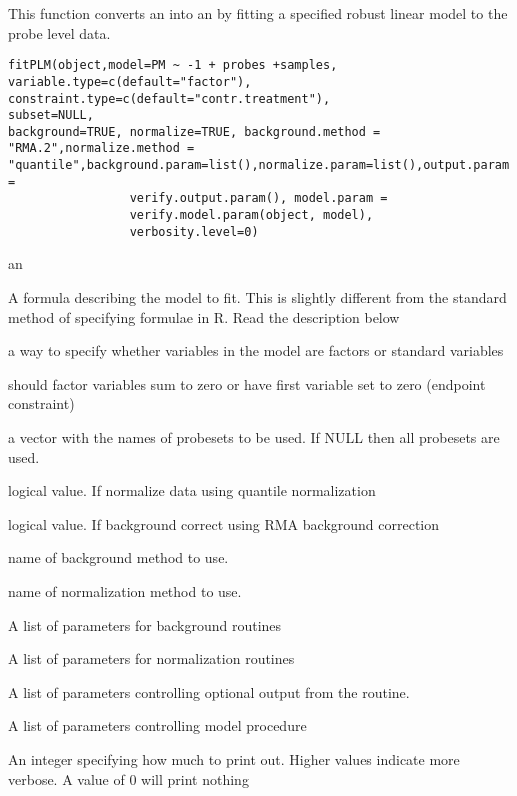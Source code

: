 \begin{Description}\relax
This function converts an  into an
 by fitting a specified robust linear model to the
probe level data.
\end{Description}
\begin{Usage}
\begin{verbatim}
fitPLM(object,model=PM ~ -1 + probes +samples,
variable.type=c(default="factor"),
constraint.type=c(default="contr.treatment"),
subset=NULL,
background=TRUE, normalize=TRUE, background.method = "RMA.2",normalize.method = "quantile",background.param=list(),normalize.param=list(),output.param =
                 verify.output.param(), model.param =
                 verify.model.param(object, model),
                 verbosity.level=0)
\end{verbatim}
\end{Usage}
\begin{Arguments}
\begin{ldescription}
\item[\code{object}] an 
\item[\code{model}] A formula describing the model to fit. This is slightly
different from the standard method of specifying formulae in R. Read
the description below
\item[\code{variable.type}] a way to specify whether variables in the model
are factors or standard variables
\item[\code{constraint.type}] should factor variables sum to zero or have
first variable set to zero (endpoint constraint)
\item[\code{subset}] a vector with the names of probesets to be used. If NULL
then all probesets are used.
\item[\code{normalize}] logical value. If  normalize data using
quantile normalization
\item[\code{background}] logical value. If  background correct
using RMA background correction
\item[\code{background.method}] name of background method to use.
\item[\code{normalize.method}] name of normalization method to use.
\item[\code{background.param}] A list of parameters for background routines
\item[\code{normalize.param}] A list of parameters for normalization
routines
\item[\code{output.param}] A list of parameters controlling optional output
from the routine.
\item[\code{model.param}] A list of parameters controlling model procedure
\item[\code{verbosity.level}] An integer specifying how much to print
out. Higher values indicate more verbose. A value of 0 will print nothing
\end{ldescription}
\end{Arguments}
